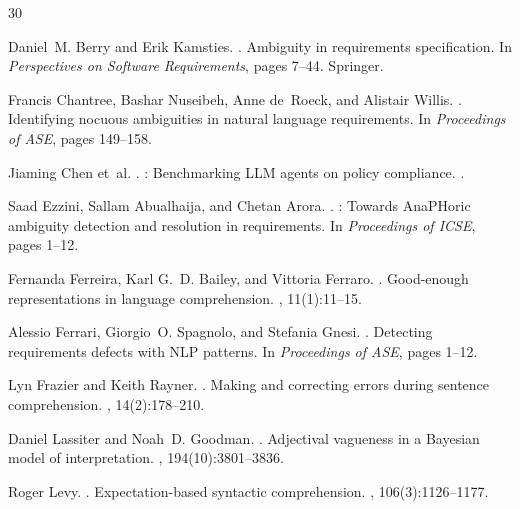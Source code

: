 \documentclass[11pt,a4paper]{article}
\begin{document}
\begin{thebibliography}{30}

Daniel~M. Berry and Erik Kamsties.
.
\newblock Ambiguity in requirements specification.
\newblock In {\em Perspectives on Software Requirements}, pages 7--44. Springer.

Francis Chantree, Bashar Nuseibeh, Anne de~Roeck, and Alistair Willis.
.
\newblock Identifying nocuous ambiguities in natural language requirements.
\newblock In {\em Proceedings of ASE}, pages 149--158.

Jiaming Chen et~al.
.
: Benchmarking {LLM} agents on policy compliance.
.

Saad Ezzini, Sallam Abualhaija, and Chetan Arora.
.
: Towards {AnaPHoric} ambiguity detection and resolution in requirements.
\newblock In {\em Proceedings of ICSE}, pages 1--12.

Fernanda Ferreira, Karl G.~D. Bailey, and Vittoria Ferraro.
.
\newblock Good-enough representations in language comprehension.
, 11(1):11--15.

Alessio Ferrari, Giorgio~O. Spagnolo, and Stefania Gnesi.
.
\newblock Detecting requirements defects with {NLP} patterns.
\newblock In {\em Proceedings of ASE}, pages 1--12.

Lyn Frazier and Keith Rayner.
.
\newblock Making and correcting errors during sentence comprehension.
, 14(2):178--210.

Daniel Lassiter and Noah~D. Goodman.
.
\newblock Adjectival vagueness in a {Bayesian} model of interpretation.
, 194(10):3801--3836.

Roger Levy.
.
\newblock Expectation-based syntactic comprehension.
, 106(3):1126--1177.


\end{thebibliography}
\end{document}
